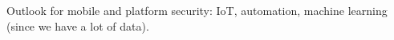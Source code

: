 
Outlook for mobile and platform security: IoT, automation, machine learning (since we have a lot of data).